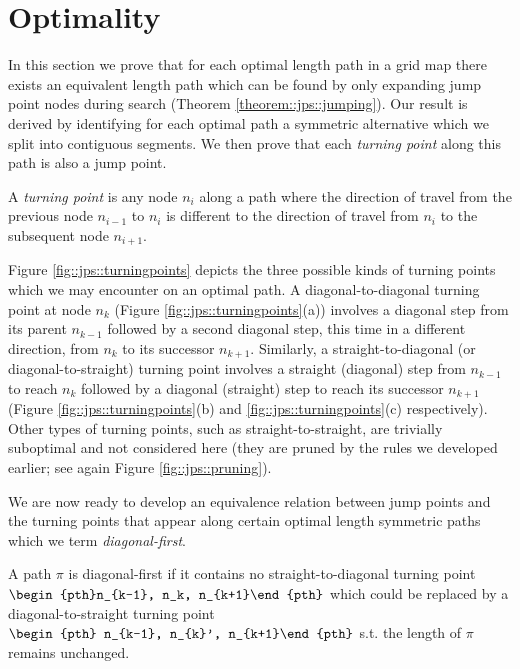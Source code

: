 \section{Optimality}
In this section we prove that for each optimal length path in a grid map there
exists an equivalent length path which can be found by only expanding jump
point nodes during search (Theorem \ref{theorem::jps::jumping}).  Our result is
derived by identifying for each optimal path a symmetric alternative which we
split into contiguous segments. We then prove that each \emph{turning point}
along this path is also a jump point.

\begin{definition}
\label{def::jps::turningpoint}
A \emph{turning point} is any node $n_{i}$ along a path where the direction of
travel from the previous node $n_{i-1}$ to $n_{i}$ is different to the direction
of travel from $n_{i}$ to the subsequent node $n_{i+1}$.
\end{definition}

Figure \ref{fig::jps::turningpoints} depicts the three possible kinds of turning
points which we may encounter on an optimal path. A diagonal-to-diagonal turning
point at node $n_k$ (Figure \ref{fig::jps::turningpoints}(a)) involves a diagonal step
from its parent $n_{k-1}$ followed by a second diagonal step, this time in a
different direction, from $n_{k}$ to its successor $n_{k+1}$.  Similarly, a
straight-to-diagonal (or diagonal-to-straight) turning point involves a straight
(diagonal) step from $n_{k-1}$ to reach $n_{k}$ followed by a diagonal
(straight) step to reach its successor $n_{k+1}$ (Figure
\ref{fig::jps::turningpoints}(b) and \ref{fig::jps::turningpoints}(c) respectively).  
Other types of turning points, such as straight-to-straight, are trivially
suboptimal and not considered here (they are pruned by the rules we developed
earlier; see again Figure \ref{fig::jps::pruning}).

We are now ready to develop an equivalence relation between
jump points and the turning points that appear along certain optimal length 
symmetric paths which we term \emph{diagonal-first}.
 
\begin{definition}
A path $\pi$ is diagonal-first if it contains no straight-to-diagonal turning point
$\begin{pth}n_{k-1}, n_k, n_{k+1}\end{pth}$
which could be replaced by a diagonal-to-straight turning point $\begin{pth}
n_{k-1}, n_{k}', n_{k+1}\end{pth}$ s.t.
the length of $\pi$ remains unchanged.
\end{definition}

